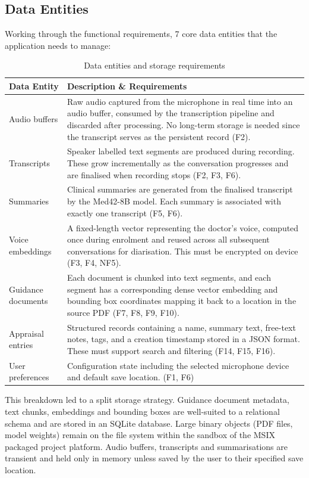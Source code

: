 \subsection{Data Entities}
Working through the functional requirements, 7 core data entities that the application needs to manage:

\begin{table}[H]
\centering
\begin{tabularx}{\textwidth}{l X}
\toprule
\textbf{Data Entity} & \textbf{Description \& Requirements} \\
\midrule
Audio buffers & Raw audio captured from the microphone in real time into an audio buffer, consumed by the transcription pipeline and discarded after processing. No long-term storage is needed since the transcript serves as the persistent record (F2). \\
Transcripts & Speaker labelled text segments are produced during recording. These grow incrementally as the conversation progresses and are finalised when recording stops (F2, F3, F6). \\
Summaries & Clinical summaries are generated from the finalised transcript by the Med42-8B model. Each summary is associated with exactly one transcript (F5, F6). \\
Voice embeddings & A fixed-length vector representing the doctor's voice, computed once during enrolment and reused across all subsequent conversations for diarisation. This must be encrypted on device (F3, F4, NF5). \\
Guidance documents & Each document is chunked into text segments, and each segment has a corresponding dense vector embedding and bounding box coordinates mapping it back to a location in the source PDF (F7, F8, F9, F10). \\
Appraisal entries & Structured records containing a name, summary text, free-text notes, tags, and a creation timestamp stored in a JSON format. These must support search and filtering (F14, F15, F16). \\
User preferences & Configuration state including the selected microphone device and default save location. (F1, F6) \\
\bottomrule
\end{tabularx}
\caption{Data entities and storage requirements}
\label{tab:data-entities}
\end{table}

This breakdown led to a split storage strategy. Guidance document metadata, text chunks, embeddings and bounding boxes are well-suited to a relational schema and are stored in an SQLite database. Large binary objects (PDF files, model weights) remain on the file system within the sandbox of the MSIX packaged project platform. Audio buffers, transcripts and summarisations are transient and held only in memory unless saved by the user to their specified save location.

